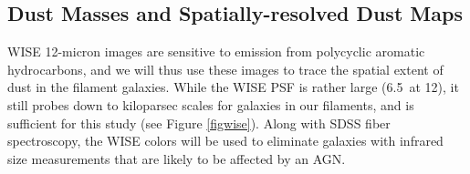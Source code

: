 \documentclass[11pt, preprint]{aastex}
\begin{document}
{%




\vspace*{-1cm}
\subsection{Dust Masses and Spatially-resolved Dust Maps}
\vspace*{-.3cm}
\label{wise}
WISE 12-micron images are sensitive to emission from polycyclic
aromatic hydrocarbons, and we will thus use these images to trace the spatial extent of dust in the filament galaxies.  
While the WISE PSF is rather large
(6.5\arcsec \ at 12\micron), it
still probes down to kiloparsec scales for galaxies in our filaments,
and is sufficient for this study (see Figure \ref{figwise}).   Along with SDSS fiber
spectroscopy, the WISE colors will be used to eliminate galaxies with
infrared size measurements that are likely to be affected by an AGN.


}
\end{document}
